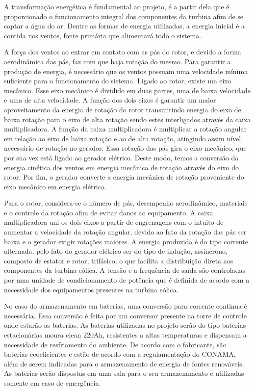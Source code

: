 A transformação energética é fundamental ao projeto, é a partir dela que é proporcionado o funcionamento integral dos componentes da turbina afim de se captar a água do ar. Dentre as formas de energia utilizadas, a energia inicial é a contida nos ventos, fonte primária que alimentará todo o sistema. 

A força dos ventos ao entrar em contato com as pás do rotor, e devido a forma aerodinâmica das pás, faz com que haja rotação do mesmo. Para garantir a produção de energia, é necessário que os ventos possuam uma velocidade mínima suficiente para o funcionamento do sistema.  Ligado ao rotor, existe um eixo mecânico. Esse eixo mecânico é dividido em duas partes, uma de baixa velocidade e uma de alta velocidade. A função dos dois eixos é garantir um maior aproveitamento da energia de rotação do rotor transmitindo energia do eixo de baixa rotação para o eixo de alta rotação sendo estes interligados através da caixa multiplicadora. A função da caixa multiplicadora é multiplicar a rotação angular em relação ao eixo de baixa rotação e ao de alta rotação, atingindo assim nível necessário de rotação no gerador. Essa rotação das pás gira o eixo mecânico, que por sua vez está ligado ao gerador elétrico. Deste modo, temos a conversão da energia cinética dos ventos em energia mecânica de rotação através do eixo do rotor. Por fim, o gerador  converte a energia mecânica de rotação proveniente do eixo mecânico em energia elétrica. 

Para o rotor, considera-se o número de pás, desempenho aerodinâmico, materiais e o controle da rotação afim de evitar danos ao equipamento. A caixa multiplicadora uni os dois eixos a partir de engrenagens com o intuito de aumentar a velocidade da rotação angular, devido ao fato da rotação das pás ser baixa e o gerador exigir rotações maiores. A energia produzida é do tipo corrente alternada, pelo fato do gerador elétrico ser do tipo de indução, assíncrono, composto de estator e rotor, trifásico, o que facilita a distribuição direta aos componentes da turbina eólica. A tensão e a frequência de saída são controladas por uma unidade de condicionamento de potência que é definida de acordo com a necessidade dos equipamentos presentes na turbina eólica.

No caso do armazenamento em baterias, uma conversão para corrente continua é necessária. Essa conversão é feita por um conversor presente na torre de controle onde estarão as baterias.  As baterias utilizadas no projeto serão do tipo baterias estacionárias moura clean 220Ah, resistentes a altas temperaturas e dispensam a necessidade de resfriamento do ambiente. De acordo com o fabricante, são baterias ecoeficientes e estão de acordo com a regulamentação do CONAMA, além de serem indicadas para o armazenamento de energia de fontes renováveis. As baterias serão dispostas em uma sala para o seu armazenamento e utilizadas somente em caso de emergência. 

